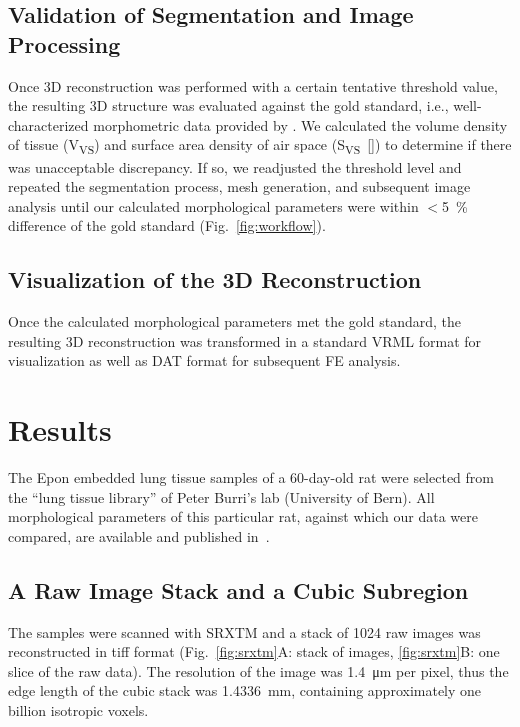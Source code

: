 \subsection[Validation of Segmentation]{Validation of Segmentation and Image Processing}
Once 3D reconstruction was performed with a certain tentative threshold value, the resulting 3D structure was evaluated against the gold standard, i.e., well-characterized morphometric data provided by \citet{Tschanz2003}. We calculated the volume density of tissue (V\textsubscript{VS}) and surface area density of air space (S\textsubscript{VS}~[\centimetresquared\per\centimetrecubed]) to determine if there was unacceptable discrepancy. If so, we readjusted the threshold level and repeated the segmentation process, mesh generation, and subsequent image analysis until our calculated morphological parameters were within $<$\SI{5}{\percent} difference of the gold standard (Fig.~\ref{fig:workflow}).

\subsection[Visualization of the Reconstruction]{Visualization of the 3D Reconstruction}
Once the calculated morphological parameters met the gold standard, the resulting 3D reconstruction was transformed in a standard VRML format for visualization as well as DAT format for subsequent FE analysis.

\section{Results}
The Epon embedded lung tissue samples of a 60-day-old rat were selected from the ``lung tissue library'' of Peter Burri's lab (University of Bern). All morphological parameters of this particular rat, against which our data were compared, are available and published in~\citet{Tschanz2003}.

\subsection{A Raw Image Stack and a Cubic Subregion}
The samples were scanned with SRXTM and a stack of 1024 raw images was reconstructed in tiff format (Fig.~\ref{fig:srxtm}A: stack of images, \ref{fig:srxtm}B: one slice of the raw data). The resolution of the image was \SI{1.4}{\micro\meter} per pixel, thus the edge length of the cubic stack was \SI{1.4336}{\milli\meter}, containing approximately one billion isotropic voxels.

